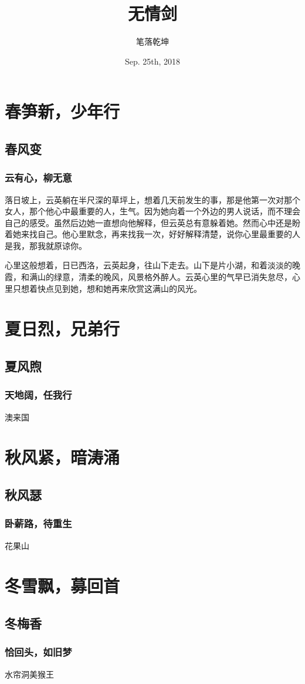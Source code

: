\documentclass{book}
\begin{document}
	\title{无情剑}
	\author{笔落乾坤}
     \date{Sep. 25th, 2018}
     \maketitle
     \tableofcontents
     \part{春笋新，少年行}
        \chapter{春风变}
             \section{云有心，柳无意} 
                 落日坡上，云英躺在半尺深的草坪上，想着几天前发生的事，那是他第一次对那个女人，那个他心中最重要的人，生气。因为她向着一个外边的男人说话，而不理会自己的感受。虽然后边她一直想向他解释，但云英总有意躲着她。然而心中还是盼着她来找自己。他心里默念，再来找我一次，好好解释清楚，说你心里最重要的人是我，那我就原谅你。

                 心里这般想着，日已西洛，云英起身，往山下走去。山下是片小湖，和着淡淡的晚霞，和满山的绿意，清柔的晚风，风景格外醉人。云英心里的气早已消失怠尽，心里只想着快点见到她，想和她再来欣赏这满山的风光。

    \part{夏日烈，兄弟行}
        \chapter{夏风煦}
            \section{天地阔，任我行}
                澳来国

    \part{秋风紧，暗涛涌}
        \chapter{秋风瑟}
            \section{卧薪路，待重生}
                花果山

    \part{冬雪飘，募回首}
        \chapter{冬梅香}
            \section{恰回头，如旧梦}
                水帘洞美猴王
\end{document}
